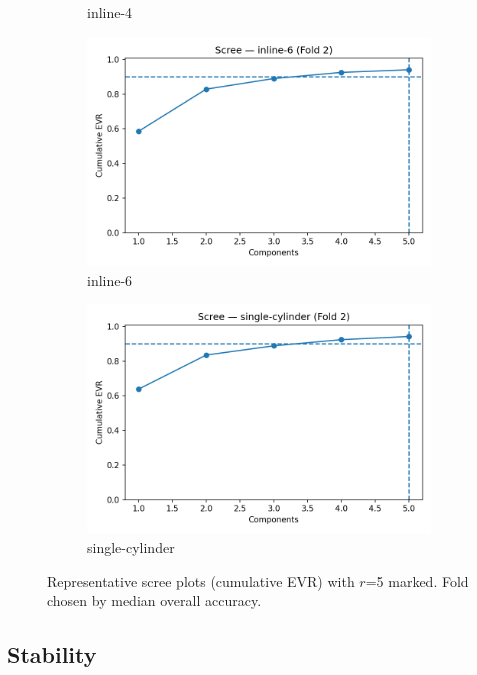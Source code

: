 \documentclass[11pt]{article}
\newcommand{\rankr}{\ensuremath{r}\xspace}
\newcommand{\EVR}{EVR\xspace}
\begin{document}
\begin{figure}[!htbp]
\begin{subfigure}{0.19\linewidth}
  \caption{inline-4}
\end{subfigure}\hfill
\begin{subfigure}{0.19\linewidth}
  \includegraphics[width=\linewidth]{rep_scree_inline-6.png}
  \caption{inline-6}
\end{subfigure}\hfill
\begin{subfigure}{0.19\linewidth}
  \includegraphics[width=\linewidth]{rep_scree_single-cylinder.png}
  \caption{single-cylinder}
\end{subfigure}
\caption{Representative scree plots (cumulative \EVR) with \rankr=5 marked. Fold chosen by median overall accuracy.}
\label{fig:scree}
\end{figure}

\subsection{Stability}
\end{document}
